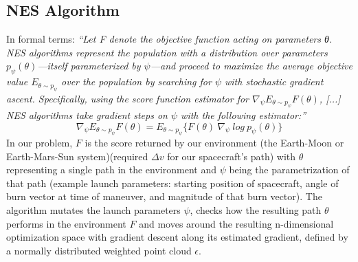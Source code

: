 \subsection{NES Algorithm}
In formal terms: \emph{``Let F denote the objective function acting on parameters θ. NES algorithms represent the population with a distribution over parameters \(p_\psi (\theta)\)—itself parameterized by $\psi$—and proceed to maximize the average objective value \(E_{\theta \sim p_\psi}\) over the population by searching for $\psi$ with stochastic gradient ascent. Specifically, using the score function estimator for $\nabla_\psi E_{\theta \sim p_\psi} F(\theta)$, [...] NES algorithms take gradient steps on $\psi$ with the following estimator:''} \cite[p.~2]{Salimans2017}
\begin{equation}
    \nabla_\psi E_{\theta \sim p_\psi} F(\theta)
    = E_{\theta \sim p_\psi} \{F(\theta)~\nabla_\psi~log~p_\psi(\theta)\}
\end{equation}
In our problem, \(F\) is the score returned by our environment (the Earth-Moon or Earth-Mars-Sun system)(required $\Delta v$ for our spacecraft's path) with \(\theta\) representing a single path in the environment and \(\psi\) being the parametrization of that path (example launch parameters: starting position of spacecraft, angle of burn vector at time of maneuver, and magnitude of that burn vector). The algorithm mutates the launch parameters \(\psi\), checks how the resulting path \(\theta\) performs in the environment \(F\) and moves around the resulting n-dimensional optimization space with gradient descent along its estimated gradient, defined by a normally distributed weighted point cloud \(\epsilon\).

